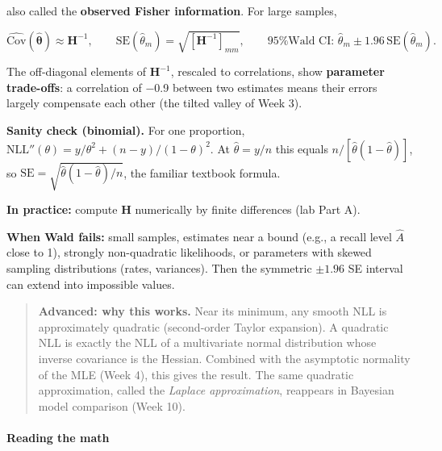also called the \textbf{observed Fisher information}. For large samples,

\[
\widehat{\mathrm{Cov}}(\hat{\boldsymbol\theta}) \approx \mathbf{H}^{-1}, \qquad
\mathrm{SE}(\hat\theta_m) = \sqrt{[\mathbf{H}^{-1}]_{mm}}, \qquad
\text{95\% Wald CI: } \hat\theta_m \pm 1.96\,\mathrm{SE}(\hat\theta_m).
\]

The off-diagonal elements of \(\mathbf{H}^{-1}\), rescaled to
correlations, show \textbf{parameter trade-offs}: a correlation of −0.9
between two estimates means their errors largely compensate each other
(the tilted valley of Week 3).

\textbf{Sanity check (binomial).} For one proportion,
\(\mathrm{NLL}''(\theta) = y/\theta^2 + (n-y)/(1-\theta)^2\). At
\(\hat\theta = y/n\) this equals \(n / [\hat\theta(1-\hat\theta)]\), so
\(\mathrm{SE} = \sqrt{\hat\theta(1-\hat\theta)/n}\), the familiar
textbook formula.

\textbf{In practice:} compute \(\mathbf{H}\) numerically by finite
differences (lab Part A).

\textbf{When Wald fails:} small samples, estimates near a bound (e.g., a
recall level \(\hat A\) close to 1), strongly non-quadratic likelihoods,
or parameters with skewed sampling distributions (rates, variances).
Then the symmetric \(\pm 1.96\) SE interval can extend into impossible
values.

\begin{quote}
\textbf{Advanced: why this works.} Near its minimum, any smooth NLL is
approximately quadratic (second-order Taylor expansion). A quadratic NLL
is exactly the NLL of a multivariate normal distribution whose inverse
covariance is the Hessian. Combined with the asymptotic normality of the
MLE (Week 4), this gives the result. The same quadratic approximation,
called the \emph{Laplace approximation}, reappears in Bayesian model
comparison (Week 10).
\end{quote}

\paragraph{Reading the math}

